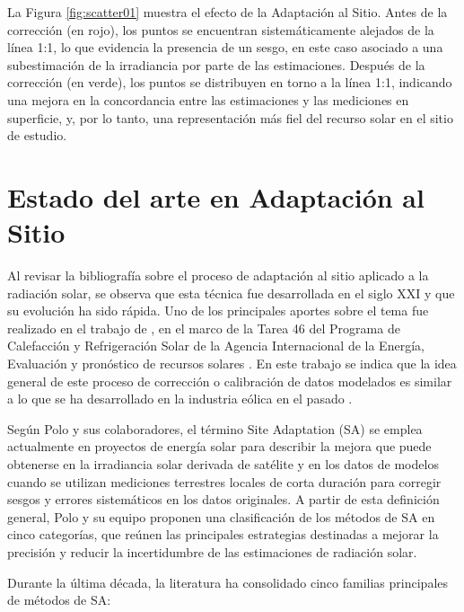 La Figura \ref{fig:scatter01} muestra el efecto de la Adaptación al Sitio. Antes de la corrección (en rojo), los puntos se encuentran sistemáticamente alejados de la línea 1:1, lo que evidencia la presencia de un sesgo, en este caso asociado a una subestimación de la irradiancia por parte de las estimaciones. Después de la corrección (en verde), los puntos se distribuyen en torno a la línea 1:1, indicando una mejora en la concordancia entre las estimaciones y las mediciones en superficie, y, por lo tanto, una representación más fiel del recurso solar en el sitio de estudio.

\section{Estado del arte en Adaptación al Sitio}
Al revisar la bibliografía sobre el proceso de adaptación al sitio aplicado a la radiación solar, se observa que esta técnica fue desarrollada en el siglo XXI y que su evolución ha sido rápida. Uno de los principales aportes sobre el tema fue realizado en el trabajo de \cite{POLO2016}, en el marco de la Tarea 46 del Programa de Calefacción y Refrigeración Solar de la Agencia Internacional de la Energía, Evaluación y pronóstico de recursos solares \citep{Task46}. En este trabajo se indica que la idea general de este proceso de corrección o calibración de datos modelados es similar a lo que se ha desarrollado en la industria eólica en el pasado \citep{Potter}.

Según Polo y sus colaboradores, el término Site Adaptation (SA) se emplea actualmente en proyectos de energía solar para describir la mejora que puede obtenerse en la irradiancia solar derivada de satélite y en los datos de modelos cuando se utilizan mediciones terrestres locales de corta duración para corregir sesgos y errores sistemáticos en los datos originales. A partir de esta definición general, Polo y su equipo proponen una clasificación de los métodos de SA en cinco categorías, que reúnen las principales estrategias destinadas a mejorar la precisión y reducir la incertidumbre de las estimaciones de radiación solar.


Durante la última década, la literatura ha consolidado cinco familias principales de métodos de SA:


